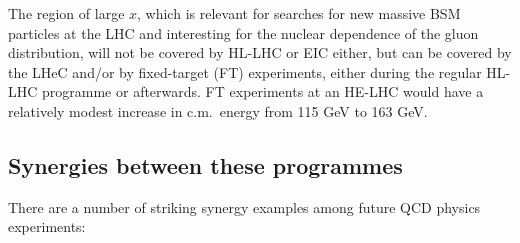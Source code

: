 The region of large $x$, which is relevant for searches for new massive BSM
particles at the LHC and interesting for the nuclear dependence of the gluon
distribution, will not be covered by HL-LHC or EIC either, but can be covered
by the LHeC and/or by fixed-target (FT) experiments,
either during
the regular HL-LHC programme or afterwards. FT experiments at an HE-LHC would
have a relatively modest increase in c.m.\ energy from 115 GeV to 163 GeV.

\subsection{Synergies between these programmes}

There are a number of striking synergy examples among future QCD physics
experiments:

